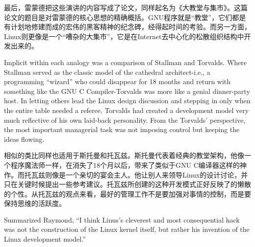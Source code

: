 \ifdefined\chs
最后，雷蒙德把这些演讲的内容写成了论文，同样起名为《大教堂与集市》。这篇论文的题目是对雷蒙德的核心思想的精确概括。GNU程序就是``教堂''，它们都是有计划地修建而成的宏伟的黑客精神的纪念碑，经得起时间的考验。而另一方面，Linux则更像是一个``嘈杂的大集市''，它是在Internet去中心化的松散组织结构中开发出来的。
\fi



\ifdefined\eng
Implicit within each analogy was a comparison of Stallman and Torvalds. Where Stallman served as the classic model of the cathedral architect-i.e., a programming ``wizard'' who could disappear for 18 months and return with something like the GNU C Compiler-Torvalds was more like a genial dinner-party host. In letting others lead the Linux design discussion and stepping in only when the entire table needed a referee, Torvalds had created a development model very much reflective of his own laid-back personality. From the Torvalds' perspective, the most important managerial task was not imposing control but keeping the ideas flowing.
\fi

\ifdefined\chs
相似的类比同样也适用于斯托曼和托瓦兹。斯托曼代表着经典的教堂架构，他像一个程序魔法师一样，在消失了18个月以后，带来了类似于GNU C编译器这样的神作。而托瓦兹则像是一个亲切的宴会主人。他让别人来领导Linux的设计讨论，并只在关键时候提出一些参考建议。托瓦兹所创建的这种开发模式正好反映了的懒散的个性。从托瓦兹的观点来看，最好的管理工作不是要加强对事情的控制，而是要保持思维的活跃度。
\fi

\ifdefined\eng
Summarized Raymond, ``I think Linus's cleverest and most consequential hack was not the construction of the Linux kernel itself, but rather his invention of the Linux development model.''
\fi

